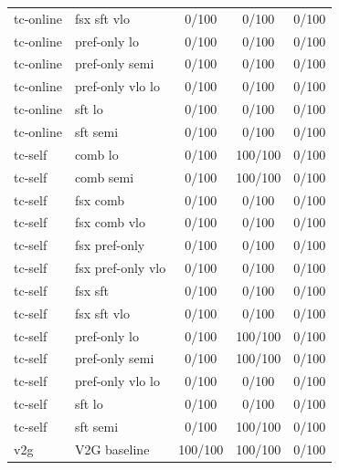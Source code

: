 \documentclass[10pt,landscape]{article}
\begin{document}
\begin{tabular}{llccc}
tc-online & fsx sft vlo & \cellcolor{missing}0/100 & \cellcolor{missing}0/100 & \cellcolor{missing}0/100 \\
tc-online & pref-only lo & \cellcolor{missing}0/100 & \cellcolor{missing}0/100 & \cellcolor{missing}0/100 \\
tc-online & pref-only semi & \cellcolor{missing}0/100 & \cellcolor{missing}0/100 & \cellcolor{missing}0/100 \\
tc-online & pref-only vlo lo & \cellcolor{missing}0/100 & \cellcolor{missing}0/100 & \cellcolor{missing}0/100 \\
tc-online & sft lo & \cellcolor{missing}0/100 & \cellcolor{missing}0/100 & \cellcolor{missing}0/100 \\
tc-online & sft semi & \cellcolor{missing}0/100 & \cellcolor{missing}0/100 & \cellcolor{missing}0/100 \\
tc-self & comb lo & \cellcolor{missing}0/100 & \cellcolor{done}100/100 & \cellcolor{missing}0/100 \\
tc-self & comb semi & \cellcolor{missing}0/100 & \cellcolor{done}100/100 & \cellcolor{missing}0/100 \\
tc-self & fsx comb & \cellcolor{missing}0/100 & \cellcolor{missing}0/100 & \cellcolor{missing}0/100 \\
tc-self & fsx comb vlo & \cellcolor{missing}0/100 & \cellcolor{missing}0/100 & \cellcolor{missing}0/100 \\
tc-self & fsx pref-only & \cellcolor{missing}0/100 & \cellcolor{missing}0/100 & \cellcolor{missing}0/100 \\
tc-self & fsx pref-only vlo & \cellcolor{missing}0/100 & \cellcolor{missing}0/100 & \cellcolor{missing}0/100 \\
tc-self & fsx sft & \cellcolor{missing}0/100 & \cellcolor{missing}0/100 & \cellcolor{missing}0/100 \\
tc-self & fsx sft vlo & \cellcolor{missing}0/100 & \cellcolor{missing}0/100 & \cellcolor{missing}0/100 \\
tc-self & pref-only lo & \cellcolor{missing}0/100 & \cellcolor{done}100/100 & \cellcolor{missing}0/100 \\
tc-self & pref-only semi & \cellcolor{missing}0/100 & \cellcolor{done}100/100 & \cellcolor{missing}0/100 \\
tc-self & pref-only vlo lo & \cellcolor{missing}0/100 & \cellcolor{missing}0/100 & \cellcolor{missing}0/100 \\
tc-self & sft lo & \cellcolor{missing}0/100 & \cellcolor{missing}0/100 & \cellcolor{missing}0/100 \\
tc-self & sft semi & \cellcolor{missing}0/100 & \cellcolor{done}100/100 & \cellcolor{missing}0/100 \\
v2g & V2G baseline & \cellcolor{done}100/100 & \cellcolor{done}100/100 & \cellcolor{missing}0/100 \\
\bottomrule
\end{tabular}
\vspace{1em}
\end{document}
